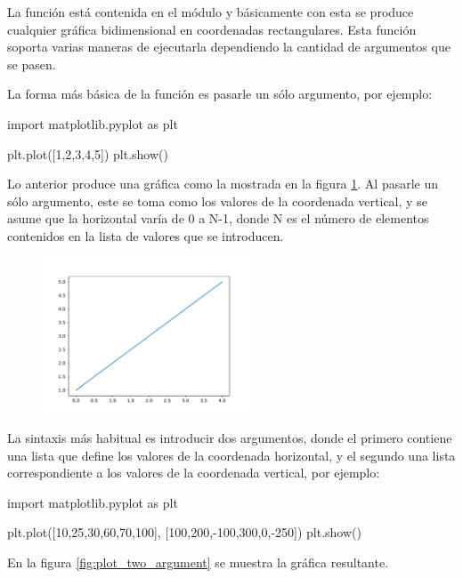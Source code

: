 La función  está contenida en el módulo  y básicamente con esta se produce cualquier gráfica 
bidimensional en coordenadas rectangulares. Esta función soporta varias maneras de ejecutarla dependiendo la cantidad 
de argumentos que se pasen. 

La forma más básica de la función  es pasarle un sólo argumento, por ejemplo:

\begin{python}
import matplotlib.pyplot as plt

plt.plot([1,2,3,4,5])
plt.show()
\end{python}

Lo anterior produce una gráfica como la mostrada en la figura \ref{fig:plot_one_argument}. Al pasarle un sólo argumento, 
este se toma como los valores de la coordenada vertical, y se asume que la horizontal varía de 0 a N-1, donde N es el 
número de elementos contenidos en la lista de valores que se introducen.

\begin{figure}[h!]
\centering
\includegraphics[width=0.55\textwidth]{img/ch03/plot_one_argument.pdf}
\label{fig:plot_one_argument}
\end{figure}

La sintaxis más habitual es introducir dos argumentos, donde el primero contiene una lista  que define los valores 
de la coordenada horizontal, y el segundo una lista  correspondiente a los valores de la coordenada vertical, 
por ejemplo:

\begin{python}
import matplotlib.pyplot as plt

plt.plot([10,25,30,60,70,100], [100,200,-100,300,0,-250])
plt.show()
\end{python}

En la figura \ref{fig:plot_two_argument} se muestra la gráfica resultante.

